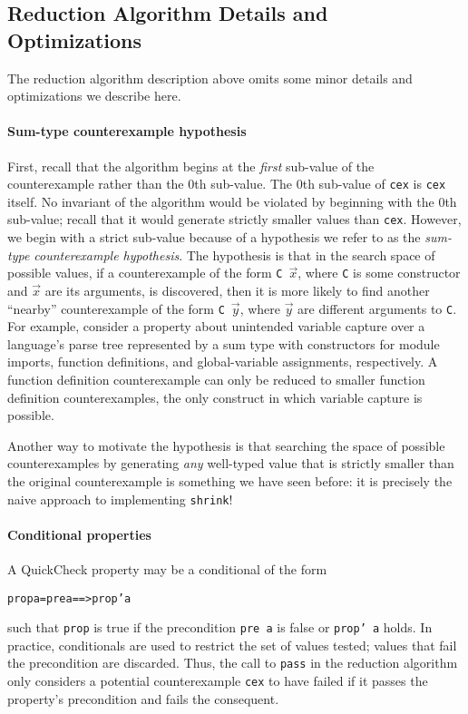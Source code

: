 \documentclass[10pt]{sigplanconf}
\newenvironment{code}{\begin{alltt}}{\end{alltt}}
\newcommand{\ttp}[1]{\texttt{#1}}
\begin{document}
\subsection{Reduction Algorithm Details and Optimizations}
The reduction algorithm description above omits some minor details and
optimizations we describe here.

\paragraph{Sum-type counterexample hypothesis}
First, recall that the algorithm begins at the \emph{first} sub-value of the
counterexample rather than the 0th sub-value.  The 0th sub-value of \ttp{cex} is
\ttp{cex} itself.  No invariant of the algorithm would be violated by beginning
with the 0th sub-value; recall that it would generate strictly smaller values
than \ttp{cex}.  However, we begin with a strict sub-value because of a
hypothesis we refer to as the \emph{sum-type counterexample hypothesis}.  The
hypothesis is that in the search space of possible values, if a counterexample
of the form \ttp{C}~$\vec{x}$, where \ttp{C} is some constructor and $\vec{x}$
are its arguments, is discovered, then it is more likely to find another
``nearby'' counterexample of the form \ttp{C}~$\vec{y}$, where $\vec{y}$ are
different arguments to \ttp{C}.  For example, consider a property about
unintended variable capture over a language's parse tree represented by a sum
type with constructors for module imports, function definitions, and
global-variable assignments, respectively.  A function definition counterexample
can only be reduced to smaller function definition counterexamples, the only
construct in which variable capture is possible.

Another way to motivate the hypothesis is that searching the space of possible
counterexamples by generating \emph{any} well-typed value that is strictly
smaller than the original counterexample is something we have seen before: it is
precisely the naive approach to implementing \ttp{shrink}!  

\paragraph{Conditional properties}
A QuickCheck property may be a conditional of the form
%
\begin{code}
prop a = pre a ==> prop' a
\end{code}
%
\noindent
such that \ttp{prop} is true if the precondition \ttp{pre a} is false or
\ttp{prop' a} holds.  In practice, conditionals are used to restrict the set of
values tested; values that fail the precondition are discarded.  Thus, the call
to \ttp{pass} in the reduction algorithm only considers a potential
counterexample \ttp{cex} to have failed if it passes the property's
precondition and fails the consequent.
\end{document}
